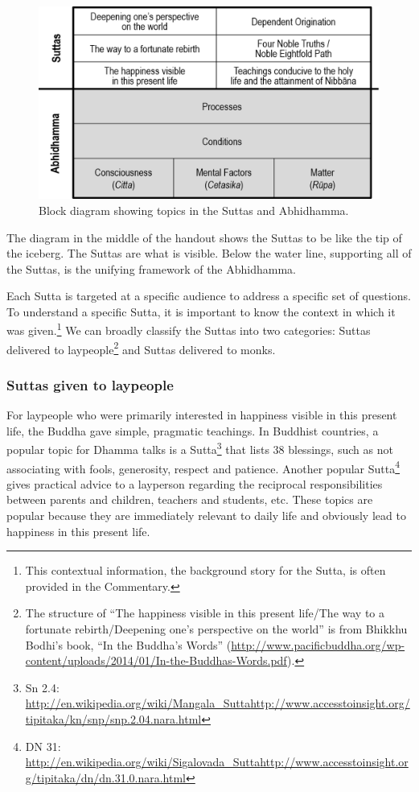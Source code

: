 \pagebreak

\begin{figure}[H]
\centering
\includegraphics[width=0.6\linewidth]{./Diagrams/Block}
\caption{Block diagram showing topics in the Suttas and Abhidhamma.}
\label{fig:Block}
\end{figure}

The diagram in the middle of the handout shows the Suttas to be like the tip of the iceberg. The Suttas are what is visible. Below the water line, supporting all of the Suttas, is the unifying framework of the Abhidhamma.

Each Sutta is targeted at a specific audience to address a specific set of questions. To understand a specific Sutta, it is important to know the context in which it was given.\footnote{This contextual information, the background story for the Sutta, is often provided in the Commentary.} We can broadly classify the Suttas into two categories: Suttas delivered to laypeople\footnote{The structure of “The happiness visible in this present life/The way to a fortunate rebirth/Deepening one’s perspective on the world” is from Bhikkhu Bodhi’s book, “In the Buddha’s Words” (\url{http://www.pacificbuddha.org/wp-content/uploads/2014/01/In-the-Buddhas-Words.pdf}).} and Suttas delivered to monks.

\subsubsection*{Suttas given to laypeople}

For laypeople who were primarily interested in happiness visible in this present life, the Buddha gave simple, pragmatic teachings. In Buddhist countries, a popular topic for Dhamma talks is a Sutta\footnote{Sn 2.4: \url{http://en.wikipedia.org/wiki/Mangala_Sutta}\newline \url{http://www.accesstoinsight.org/tipitaka/kn/snp/snp.2.04.nara.html}} that lists 38 blessings, such as not associating with fools, generosity, respect and patience. Another popular Sutta\footnote{DN 31: \url{http://en.wikipedia.org/wiki/Sigalovada_Sutta}\newline \url{http://www.accesstoinsight.org/tipitaka/dn/dn.31.0.nara.html}} gives practical advice to a layperson regarding the reciprocal responsibilities between parents and children, teachers and students, etc. These topics are popular because they are immediately relevant to daily life and obviously lead to happiness in this present life.


